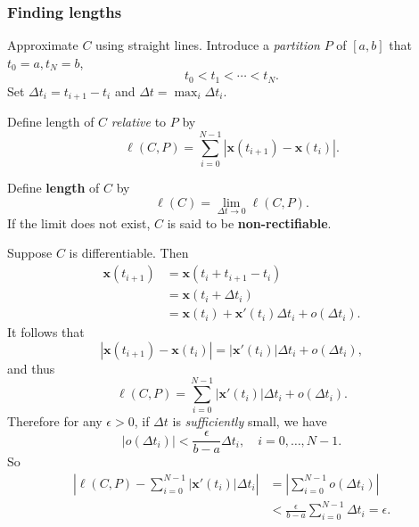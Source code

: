 \subsubsection{Finding lengths}

Approximate $C$ using straight lines. Introduce a \textit{partition} $P$ of $[a,b]$ that $ t_0 = a, t_N = b $,
\[
    t_0<t_1<\cdots<t_N.
\]
Set $ \Delta t_i = t_{i+1}-t_i $ and $ \Delta t = \max_i \Delta t_i $.
\begin{definition}
    Define length of $C$ \textit{relative} to $P$ by
    \[
        \ell (C,P) = \sum_{i=0}^{N-1} \left| \mathbf{x}(t_{i+1})-\mathbf{x}(t_i) \right|.
    \]
\end{definition}

\begin{center}
\end{center}

\begin{definition}
    Define \textbf{length} of $C$ by
    \[
        \ell (C) = \lim_{\Delta t \to 0} \ell (C,P).
    \]
    If the limit does not exist, $C$ is said to be \textbf{non-rectifiable}.
\end{definition}

Suppose $C$ is differentiable. Then
\begin{align*}
    \mathbf{x}(t_{i+1}) & = \mathbf{x}(t_i+t_{i+1}-t_i)                                   \\
                        & = \mathbf{x}(t_i+ \Delta t_i)                                   \\
                        & = \mathbf{x}(t_i) + \mathbf{x}'(t_i)\Delta t_i + o(\Delta t_i).
\end{align*}
It follows that
\[
    \left| \mathbf{x}(t_{i+1})- \mathbf{x}(t_i)\right| =\left| \mathbf{x}'(t_i) \right| \Delta t_i + o(\Delta t_i),
\]
and thus 
\[
    \ell (C,P) = \sum_{i=0}^{N-1} \left| \mathbf{x}'(t_i) \right| \Delta t_i + o(\Delta t_i).
\]
Therefore for any $ \epsilon>0 $, if $ \Delta t $ is \textit{sufficiently} small, we have 
\[
    \left| o(\Delta t_i) \right| < \frac{\epsilon }{b-a} \Delta t_i, \quad i=0,\dots,N-1.
\]
So 
\begin{align*}
    \left| \ell (C,P) - \sum_{i=0}^{N-1} \left| \mathbf{x}'(t_i) \right| \Delta t_i \right| &= \left| \sum_{i=0}^{N-1} o(\Delta t_i) \right| \\ 
    &< \frac{\epsilon}{b-a} \sum_{i=0}^{N-1} \Delta t_i = \epsilon.
\end{align*}

